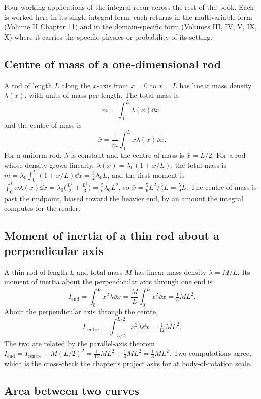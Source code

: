 Four working applications of the integral recur across the rest of
the book. Each is worked here in its single-integral form; each
returns in the multivariable form (Volume II Chapter 11) and in the
domain-specific form (Volumes III, IV, V, IX, X) where it carries
the specific physics or probability of its setting.

\subsection{Centre of mass of a one-dimensional rod}

A rod of length $L$ along the $x$-axis from $x = 0$ to $x = L$ has
linear mass density $\lambda(x)$, with units of mass per length.
The total mass is
\[
m = \int_{0}^{L} \lambda(x) \dd x,
\]
and the centre of mass is
\[
\bar{x} = \frac{1}{m}\int_{0}^{L} x \lambda(x) \dd x.
\]
For a uniform rod, $\lambda$ is constant and the centre of mass is
$\bar{x} = L/2$. For a rod whose density grows linearly,
$\lambda(x) = \lambda_{0}(1 + x/L)$, the total mass is
$m = \lambda_{0} \int_{0}^{L}(1 + x/L) \dd x = \tfrac{3}{2}
\lambda_{0} L$, and the first moment is
$\int_{0}^{L} x \lambda(x) \dd x = \lambda_{0}\bigl(\tfrac{L^{2}}{2}
+ \tfrac{L^{2}}{3}\bigr) = \tfrac{5}{6}\lambda_{0} L^{2}$, so
$\bar{x} = \tfrac{5}{6} L^{2} / \tfrac{3}{2} L = \tfrac{5}{9} L$.
The centre of mass is past the midpoint, biased toward the heavier
end, by an amount the integral computes for the reader.

\subsection{Moment of inertia of a thin rod about a perpendicular axis}

A thin rod of length $L$ and total mass $M$ has linear mass density
$\lambda = M/L$. Its moment of inertia about the perpendicular axis
through one end is
\[
I_{\mathrm{end}} = \int_{0}^{L} x^{2} \lambda \dd x =
\frac{M}{L} \int_{0}^{L} x^{2} \dd x = \tfrac{1}{3} M L^{2}.
\]
About the perpendicular axis through the centre,
\[
I_{\mathrm{centre}} = \int_{-L/2}^{L/2} x^{2} \lambda \dd x =
\tfrac{1}{12} M L^{2}.
\]
The two are related by the parallel-axis theorem
$I_{\mathrm{end}} = I_{\mathrm{centre}} + M (L/2)^{2}
= \tfrac{1}{12} M L^{2} + \tfrac{1}{4} M L^{2} = \tfrac{1}{3} M
L^{2}$. Two computations agree, which is the cross-check the
chapter's project asks for at body-of-rotation scale.

\subsection{Area between two curves}

